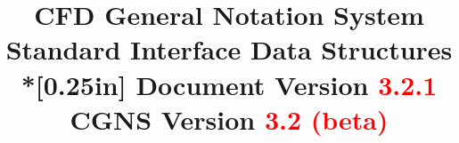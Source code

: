 \documentclass[11pt,twoside]{article}
\begin{document}
%
%
%


\fancyfoot[LE,RO]{\bfseries \thepage}

\posttitle{\par\end{flushleft}\vskip 1.0em}
\title{{\bfseries CFD General Notation System\\
Standard Interface Data Structures}\\*[0.25in]
{\Large Document Version \textcolor{red}{3.2.1}\\
CGNS Version \textcolor{red}{3.2 (beta)}}}
\author{}
\date{}
\maketitle
\thispagestyle{empty}

\end{document}
